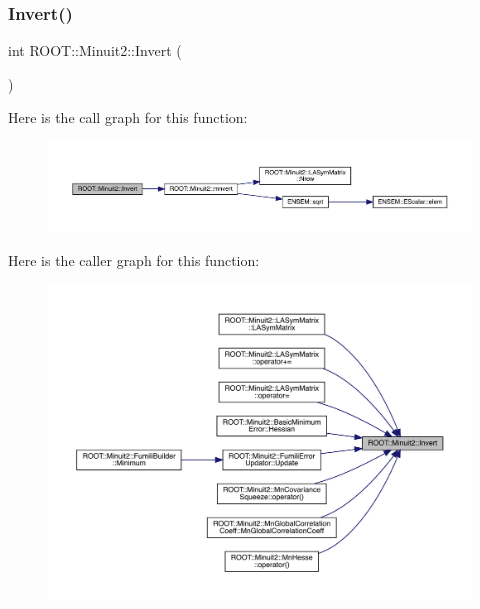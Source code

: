 \mbox{\label{namespaceROOT_1_1Minuit2_a3d7791001fe4298059c858771fba35db}} 
\subsubsection{\texorpdfstring{Invert()}{Invert()}}
{\footnotesize\ttfamily int R\+O\+O\+T\+::\+Minuit2\+::\+Invert (\begin{DoxyParamCaption}\item[{\mbox{\hyperlink{classROOT_1_1Minuit2_1_1LASymMatrix}{L\+A\+Sym\+Matrix}} \&}]{ }\end{DoxyParamCaption})}

Here is the call graph for this function\+:
\nopagebreak
\begin{figure}[H]
\begin{center}
\leavevmode
\includegraphics[width=350pt]{d6/d3a/namespaceROOT_1_1Minuit2_a3d7791001fe4298059c858771fba35db_cgraph}
\end{center}
\end{figure}
Here is the caller graph for this function\+:
\nopagebreak
\begin{figure}[H]
\begin{center}
\leavevmode
\includegraphics[width=350pt]{d6/d3a/namespaceROOT_1_1Minuit2_a3d7791001fe4298059c858771fba35db_icgraph}
\end{center}
\end{figure}
\mbox{\label{namespaceROOT_1_1Minuit2_a053d4f8b9de7ec9beead27f2ce08be44}} 
